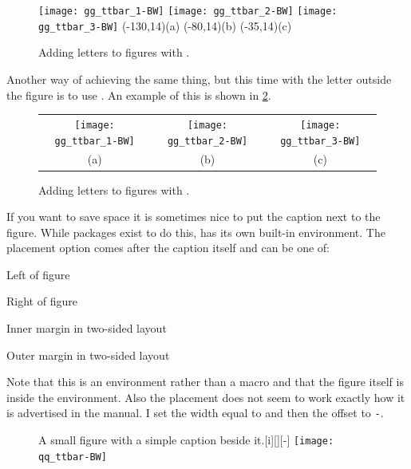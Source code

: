 \begin{figure}[htbp]
\begin{tcblisting}{}
\centering
\texttt{[image: gg\_ttbar\_1-BW]}\quad
\texttt{[image: gg\_ttbar\_2-BW]}\quad
\texttt{[image: gg\_ttbar\_3-BW]}
\put(-130,14){(a)}
\put(-80,14){(b)}
\put(-35,14){(c)}
\caption{Adding letters to figures with .}%
\label{fig:letters1}
\end{tcblisting}
\end{figure}

Another way of achieving the same thing, but this time with the letter
outside the figure is to use . An example of this is
shown in \cref{fig:letters2}.

\begin{figure}[htbp]
\begin{tcblisting}{}
\centering
\begin{tabular}{ccc}
\texttt{[image: gg\_ttbar\_1-BW]} &
\texttt{[image: gg\_ttbar\_2-BW]} &
\texttt{[image: gg\_ttbar\_3-BW]}\\
(a) & (b) & (c)
\end{tabular}
\caption{Adding letters to figures with .}%
\label{fig:letters2}
\end{tcblisting}
\end{figure}

If you want to save space it is sometimes nice to put the caption next
to the figure. While packages exist to do this, \KOMAScript{} has its
own built-in  environment. The placement option comes
after the caption itself and can be one of:
\begin{description}\setlength{\parskip}{0pt}
\item[l] Left of figure
\item[r] Right of figure
\item[i] Inner margin in two-sided layout
\item[o] Outer margin in two-sided layout
\end{description}
Note that this is an environment rather than a macro and that the
figure itself is inside the environment. Also the placement does not
seem to work exactly how it is advertised in the manual. I set the
width equal to  and then the offset to \texttt{-}.

\begin{figure}[htbp]
\begin{tcblisting}{}
\centering
\begin{captionbeside}{A small figure with a simple caption beside it.}[i][\figwidth][-\figwidth]
  \texttt{[image: qq\_ttbar-BW]}
\end{captionbeside}%
\label{fig:qqtt}
\end{tcblisting}
\end{figure}

